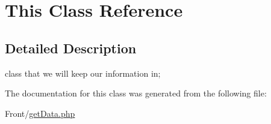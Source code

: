 \hypertarget{classThis}{}\section{This Class Reference}
\label{classThis}


\subsection{Detailed Description}
class that we will keep our information in; 

The documentation for this class was generated from the following file\+:\begin{DoxyCompactItemize}
\item 
Front/\hyperlink{getData_8php}{get\+Data.\+php}\end{DoxyCompactItemize}
